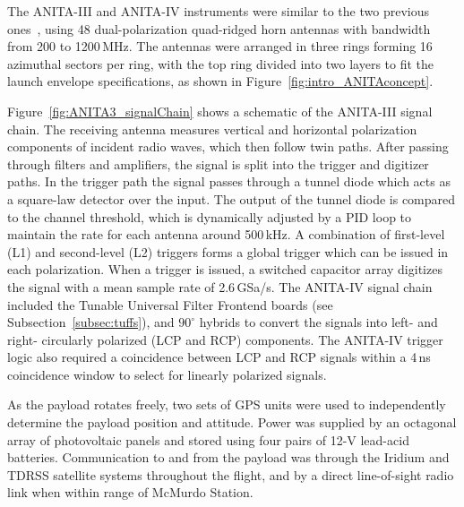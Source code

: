 The ANITA-III and ANITA-IV instruments were similar to the two previous
ones~\cite{ANITA1paper,ANITA2paper}, using 48 dual-polarization quad-ridged horn antennas with bandwidth from 200 to 1200\,MHz. 
The antennas were arranged in three rings forming 16 azimuthal sectors per ring, with the top ring divided into two layers to fit the launch envelope specifications, as shown in Figure~\ref{fig:intro_ANITAconcept}.

Figure~\ref{fig:ANITA3_signalChain} shows a schematic of the ANITA-III signal chain. 
The receiving antenna measures vertical and horizontal polarization components of incident radio waves, which then follow twin paths. 
After passing through filters and amplifiers, the signal is split into
the trigger and digitizer paths.
In the trigger path the signal passes
through a tunnel diode which acts as a square-law detector over the
input. The output of the tunnel diode is compared to the channel
threshold, which is dynamically adjusted by a PID loop to maintain the
rate for each antenna around 500\,kHz. A combination of first-level (L1) and second-level (L2) triggers forms a
global trigger which can be issued in each polarization.
When a trigger is issued, a switched capacitor array digitizes the signal with a mean sample rate of 2.6\,GSa/s. 
The ANITA-IV signal chain included the Tunable Universal Filter Frontend boards (see Subsection~\ref{subsec:tuffs}), and $90^{\circ}$ hybrids to convert the signals into left- and right- circularly polarized (LCP and RCP) components. 
The ANITA-IV trigger logic also required a coincidence between LCP and RCP signals within a 4\,ns coincidence window to select for linearly polarized signals. 

As the payload rotates freely, two sets of GPS units were used to independently determine the
payload position and attitude.
Power was supplied by an octagonal array of photovoltaic panels and stored using four pairs of 12-V lead-acid batteries.
Communication to and from the payload was through the Iridium and TDRSS satellite systems throughout the flight, and by a direct line-of-sight radio link when within range of McMurdo Station.




